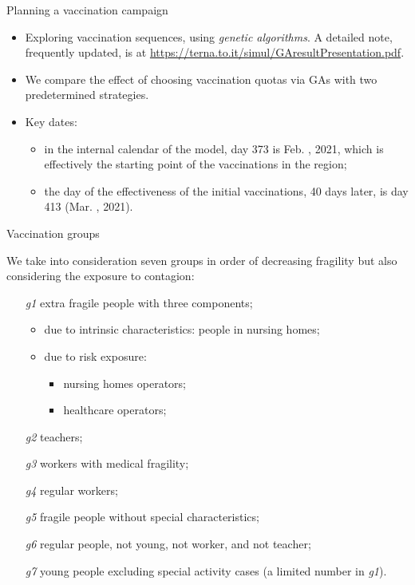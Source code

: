 \documentclass[8pt]{beamer}
\begin{document}
\begin{frame}{Planning a vaccination campaign}

\begin{itemize}
\item Exploring vaccination sequences, using \emph{genetic algorithms}. A detailed note, frequently updated, is at \url{https://terna.to.it/simul/GAresultPresentation.pdf}.

\bigskip

\item We compare the effect of choosing vaccination quotas via GAs with two predetermined strategies.

\bigskip

\item Key dates: 
\begin{itemize}
\item in the internal calendar of the model, day 373 is Feb. , 2021, which is effectively the starting point of the vaccinations in the region; 

\item the day of the effectiveness of the initial vaccinations, 40 days later, is day 413 (Mar. , 2021).
\end{itemize}

\end{itemize}

\end{frame}

\begin{frame}{Vaccination groups}

We take into consideration seven groups in order of decreasing fragility but also considering the exposure to contagion:

\begin{enumerate}
\item [\emph{g1}]
	extra fragile people with three components;
	\begin{itemize}
		\item due to intrinsic characteristics: people in nursing homes;
		\item due to risk exposure:
		\begin{itemize}
			\item nursing homes operators;
			\item healthcare operators;
 		\end{itemize} 
 	\end{itemize}  
\item [\emph{g2}]
	teachers;
\item [\emph{g3}]
	workers with medical fragility;
\item [\emph{g4}]
	regular workers;
\item [\emph{g5}]
	fragile people without special characteristics;
\item [\emph{g6}]
	regular people, not young, not worker, and not teacher;
\item [\emph{g7}]
	young people excluding special activity cases (a limited number in \emph{g1}).
\end{enumerate}

\end{frame}
\end{document}
